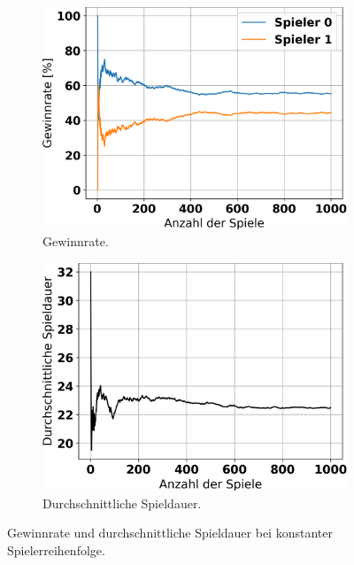 \begin{figure}[ht!]%
	\begin{subfigure}[b]{0.48\textwidth}
		\includegraphics[width=\textwidth]{Bilder/constant_player_order_graph_win_rates.png}
		\caption{Gewinnrate.}
		\label{fig:f1}
	\end{subfigure}
	\hfill
	\begin{subfigure}[b]{0.48\textwidth}
		\includegraphics[width=\textwidth]{Bilder/constant_player_order_graph_game_length.png}
		\caption{Durchschnittliche Spieldauer.}
		\label{fig:f2}
	\end{subfigure}
	\caption{Gewinnrate und durchschnittliche Spieldauer bei konstanter Spielerreihenfolge.}
\end{figure}

